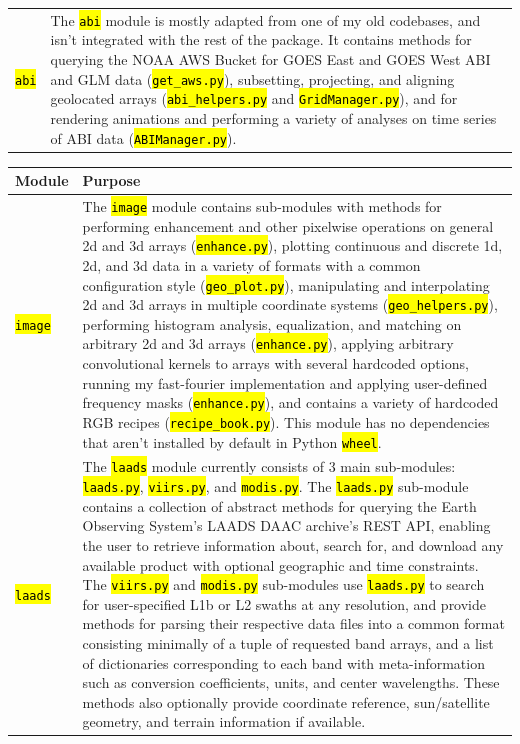 \documentclass[12pt]{article}
\newcommand{\hltexttt}[1]{\texttt{\hl{#1}}}
\begin{document}
\begin{table}[h!]
\begin{tabular}{ l p{14cm} }
        \hltexttt{abi} &
        The \hltexttt{abi} module is mostly adapted from one of my old codebases, and isn't integrated with the rest of the package. It contains methods for querying the NOAA AWS Bucket for GOES East and GOES West ABI and GLM data (\hltexttt{get\_aws.py}), subsetting, projecting, and aligning geolocated arrays (\hltexttt{abi\_helpers.py} and \hltexttt{GridManager.py}), and for rendering animations and performing a variety of analyses on time series of ABI data (\hltexttt{ABIManager.py}).
         \\
    \end{tabular}
\end{table}

\begin{table}[h]
    \begin{tabular}{ l p{14cm}}

        \textbf{Module} & \textbf{Purpose} \\\hline

        \hltexttt{image} &
        The \hltexttt{image} module contains sub-modules with methods for performing enhancement and other pixelwise operations on general 2d and 3d arrays (\hltexttt{enhance.py}), plotting continuous and discrete 1d, 2d, and 3d data in a variety of formats with a common configuration style (\hltexttt{geo\_plot.py}), manipulating and interpolating 2d and 3d arrays in multiple coordinate systems (\hltexttt{geo\_helpers.py}), performing histogram analysis, equalization, and matching on arbitrary 2d and 3d arrays (\hltexttt{enhance.py}), applying arbitrary convolutional kernels to arrays with several hardcoded options, running my fast-fourier implementation and applying user-defined frequency masks (\hltexttt{enhance.py}), and contains a variety of hardcoded RGB recipes (\hltexttt{recipe\_book.py}). This module has no dependencies that aren't installed by default in Python \hltexttt{wheel}.
        \\\hline

        \hltexttt{laads} &
        The \hltexttt{laads} module currently consists of 3 main sub-modules: \hltexttt{laads.py}, \hltexttt{viirs.py}, and \hltexttt{modis.py}. The \hltexttt{laads.py} sub-module contains a collection of abstract methods for querying the Earth Observing System's LAADS DAAC archive's REST API, enabling the user to retrieve information about, search for, and download any available product with optional geographic and time constraints. The \hltexttt{viirs.py} and \hltexttt{modis.py} sub-modules use \hltexttt{laads.py} to search for user-specified L1b or L2 swaths at any resolution, and provide methods for parsing their respective data files into a common format consisting minimally of a tuple of requested band arrays, and a list of dictionaries corresponding to each band with meta-information such as conversion coefficients, units, and center wavelengths. These methods also optionally provide coordinate reference, sun/satellite geometry, and terrain information if available.
        \\\hline


\end{tabular}
\end{table}
\end{document}
